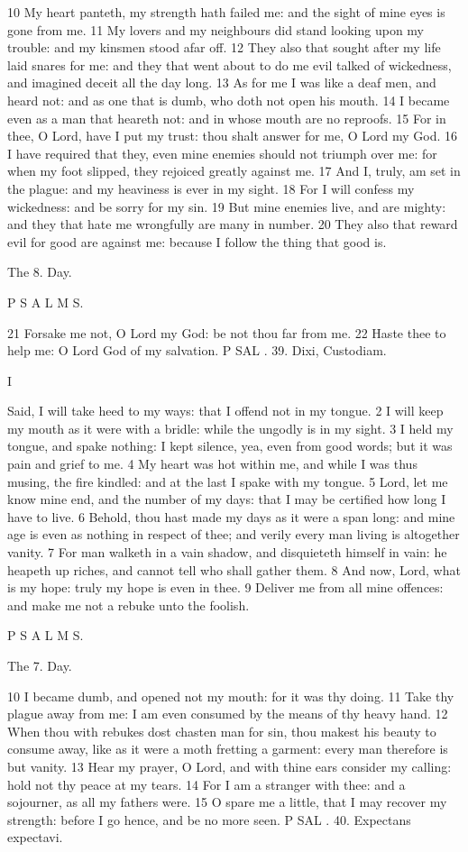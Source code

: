 10 My heart panteth, my strength hath failed me: and the sight of mine eyes is gone from me. 11 My lovers and my neighbours did stand looking upon my trouble: and my kinsmen stood afar off. 12 They also that sought after my life laid snares for me: and they that went about to do me evil talked of wickedness, and imagined deceit all the day long. 13 As for me I was like a deaf men, and heard not: and as one that is dumb, who doth not open his mouth. 14 I became even as a man that heareth not: and in whose mouth are no reproofs. 15 For in thee, O Lord, have I put my trust: thou shalt answer for me, O Lord my God. 16 I have required that they, even mine enemies should not triumph over me: for when my foot slipped, they rejoiced greatly against me. 17 And I, truly, am set in the plague: and my heaviness is ever in my sight. 18 For I will confess my wickedness: and be sorry for my sin. 19 But mine enemies live, and are mighty: and they that hate me wrongfully are many in number. 20 They also that reward evil for good are against me: because I follow the thing that good is.

The 8. Day.

P S A L M S.

21 Forsake me not, O Lord my God: be not thou far from me. 22 Haste thee to help me: O Lord God of my salvation. P SAL . 39. Dixi, Custodiam.

I

Said, I will take heed to my ways: that I offend not in my tongue. 2 I will keep my mouth as it were with a bridle: while the ungodly is in my sight. 3 I held my tongue, and spake nothing: I kept silence, yea, even from good words; but it was pain and grief to me. 4 My heart was hot within me, and while I was thus musing, the fire kindled: and at the last I spake with my tongue. 5 Lord, let me know mine end, and the number of my days: that I may be certified how long I have to live. 6 Behold, thou hast made my days as it were a span long: and mine age is even as nothing in respect of thee; and verily every man living is altogether vanity. 7 For man walketh in a vain shadow, and disquieteth himself in vain: he heapeth up riches, and cannot tell who shall gather them. 8 And now, Lord, what is my hope: truly my hope is even in thee. 9 Deliver me from all mine offences: and make me not a rebuke unto the foolish.

P S A L M S.

The 7. Day.

10 I became dumb, and opened not my mouth: for it was thy doing. 11 Take thy plague away from me: I am even consumed by the means of thy heavy hand. 12 When thou with rebukes dost chasten man for sin, thou makest his beauty to consume away, like as it were a moth fretting a garment: every man therefore is but vanity. 13 Hear my prayer, O Lord, and with thine ears consider my calling: hold not thy peace at my tears. 14 For I am a stranger with thee: and a sojourner, as all my fathers were. 15 O spare me a little, that I may recover my strength: before I go hence, and be no more seen. P SAL . 40. Expectans expectavi.

